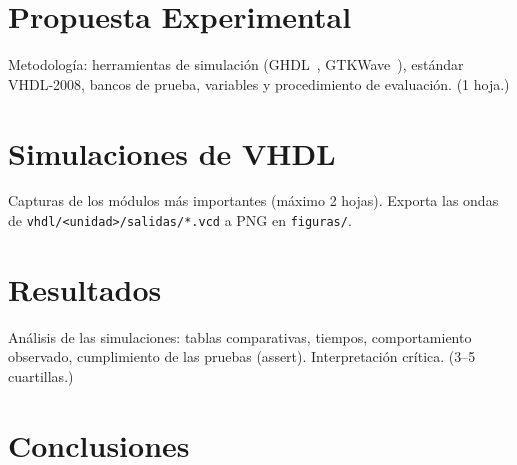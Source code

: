 \documentclass[llncs]{llncs}
\begin{document}
\section{Propuesta Experimental}
\label{sec:propuesta}

Metodología: herramientas de simulación (GHDL~\cite{ghdl-docs},
GTKWave~\cite{gtkwave-docs}), estándar VHDL-2008, bancos de
prueba, variables y procedimiento de evaluación. (1 hoja.)

\section{Simulaciones de VHDL}
\label{sec:simulaciones}

Capturas de los módulos más importantes (máximo 2 hojas). Exporta las ondas
de \texttt{vhdl/<unidad>/salidas/*.vcd} a PNG en \texttt{figuras/}.


\section{Resultados}
\label{sec:resultados}

Análisis de las simulaciones: tablas comparativas, tiempos, comportamiento
observado, cumplimiento de las pruebas (assert). Interpretación crítica.
(3--5 cuartillas.)

\section{Conclusiones}
\label{sec:conclusiones}
\end{document}
